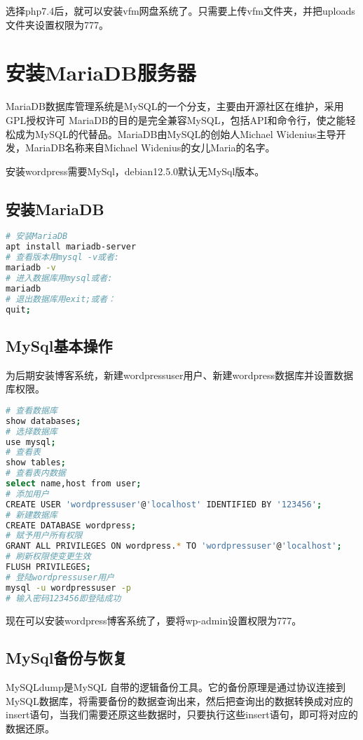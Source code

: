 \documentclass[UTF8,a4paper,12pt]{ctexbook} %
\begin{document}
选择php7.4后，就可以安装vfm网盘系统了。只需要上传vfm文件夹，并把uploads文件夹设置权限为777。


\chapter{安装MariaDB服务器}
MariaDB数据库管理系统是MySQL的一个分支，主要由开源社区在维护，采用GPL授权许可 MariaDB的目的是完全兼容MySQL，包括API和命令行，使之能轻松成为MySQL的代替品。MariaDB由MySQL的创始人Michael Widenius主导开发，MariaDB名称来自Michael Widenius的女儿Maria的名字。


安装wordpress需要MySql，debian12.5.0默认无MySql版本。

\section{安装MariaDB}
\begin{lstlisting}[language={bash}]
# 安装MariaDB
apt install mariadb-server
# 查看版本用mysql -v或者:
mariadb -v
# 进入数据库用mysql或者:
mariadb
# 退出数据库用exit;或者：
quit;
\end{lstlisting}


\section{MySql基本操作}


为后期安装博客系统，新建wordpressuser用户、新建wordpress数据库并设置数据库权限。
\begin{lstlisting}[language={bash}]
# 查看数据库
show databases;
# 选择数据库
use mysql;
# 查看表
show tables;
# 查看表内数据
select name,host from user;
# 添加用户
CREATE USER 'wordpressuser'@'localhost' IDENTIFIED BY '123456';
# 新建数据库
CREATE DATABASE wordpress;
# 赋予用户所有权限
GRANT ALL PRIVILEGES ON wordpress.* TO 'wordpressuser'@'localhost';
# 刷新权限使变更生效
FLUSH PRIVILEGES;
# 登陆wordpressuser用户
mysql -u wordpressuser -p
# 输入密码123456即登陆成功
\end{lstlisting}


现在可以安装wordpress博客系统了，要将wp-admin设置权限为777。

\section{MySql备份与恢复}
MySQLdump是MySQL 自带的逻辑备份工具。它的备份原理是通过协议连接到MySQL数据库，将需要备份的数据查询出来，然后把查询出的数据转换成对应的insert语句，当我们需要还原这些数据时，只要执行这些insert语句，即可将对应的数据还原。
\end{document}
